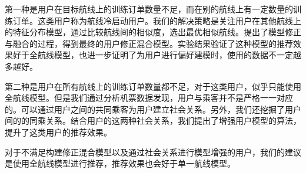第一种是用户在目标航线上的训练订单数量不足，而在别的航线上有一定数量的训练订单。这类用户称为航线冷启动用户。我们的解决策略是关注用户在其他航线上的特征分布模型，通过比较航线间的相似度，选出最优相似航线。提出了模型修正与融合的过程，得到最终的用户修正混合模型。实验结果验证了这种模型的推荐效果好于全航线模型，也进一步证明了为用户进行偏好建模时，使用的数据不一定越多越好。

第二种是用户在所有航线上的训练订单数量都不足，对于这类用户，似乎只能使用全航线模型。但是我们通过分析机票数据发现，用户与乘客并不是严格一一对应的。可以通过用户之间的共同乘客为用户建立社会关系。另外，我们还挖掘了用户间的的同乘关系。结合用户的这两种社会关系，我们提出了增强用户模型的算法，提升了这类用户的推荐效果。

对于不满足构建修正混合模型以及通过社会关系进行模型增强的用户，我们的建议是使用全航线模型进行推荐，推荐效果也会好于单一航线模型。